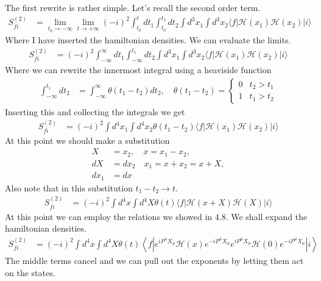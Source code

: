\documentclass[working, oneside]{../../Preambles/tuftebook}
\begin{document}
\begin{solution}
The first rewrite is rather simple. Let's recall the second order term.
\begin{align*}
S_{fi}^{(2)}
&= \lim_{t_0 \rightarrow -\infty} \lim_{t \rightarrow +\infty} (-i)^2 \int_{t_0}^t dt_1 \int_{t_0}^{t_1} dt_2 \int d^3x_1 \int d^3x_2 \langle f | \mathcal{H}(x_1) \mathcal{H}(x_2) | i \rangle
\end{align*}
Where I have inserted the hamiltonian densities. We can evaluate the limits.
\begin{align*}
S_{fi}^{(2)}
&= (-i)^2 \int_{-\infty}^\infty dt_1 \int_{-\infty}^{t_1} dt_2 \int d^3x_1 \int d^3x_2 \langle f | \mathcal{H}(x_1) \mathcal{H}(x_2) | i \rangle
\end{align*}
Where we can rewrite the innermost integral using a heaviside function
\begin{align*}
\int_{-\infty}^{t_1} dt_2
&= \int_{-\infty}^\infty \theta(t_1 - t_2) dt_2, \quad \theta(t_1 - t_2) = \begin{cases} 0 & t_2 > t_1 \\ 1 & t_1 > t_2 \end{cases}
\end{align*}
Inserting this and collecting the integrals we get
\begin{align*}
S_{fi}^{(2)}
&= (-i)^2 \int d^4x_1 \int d^4x_2 \theta(t_1 - t_2) \langle f | \mathcal{H}(x_1) \mathcal{H}(x_2) | i \rangle
\end{align*}
At this point we should make a substitution
\begin{align*}
X&= x_2, \quad x = x_1 - x_2, \\
dX &= dx_2 \quad x_1 = x + x_2 = x + X, \\
dx_1 &= dx
\end{align*}
Also note that in this substitution \( t_1 - t_2 \rightarrow t \).
\begin{align*}
S_{fi}^{(2)}
&= (-i)^2 \int d^4x \int d^4X \theta(t) \langle f | \mathcal{H}(x + X) \mathcal{H}(X) | i \rangle
\end{align*}
At this point we can employ the relations we showed in 4.8. We shall expand the hamiltonian densities.
\begin{align*}
S_{fi}^{(2)}
&= (-i)^2 \int d^4x \int d^4X \theta(t) \left\langle f \left| e^{i P^\mu X_\mu} \mathcal{H}(x) e^{-i P^\mu X_\mu} e^{i P^\mu X_\mu} \mathcal{H}(0) e^{-i P^\mu X_\mu} \right| i \right\rangle
\end{align*}
The middle terms cancel and we can pull out the exponents by letting them act on the states.

\end{solution}
\end{document}
